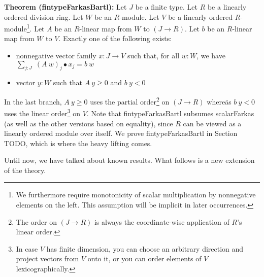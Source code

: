 \documentclass[]{article}
\renewcommand{\.}{\hskip .75pt}
\let\r=\rightarrow
\begin{document}
\medskip \noindent
\textbf{Theorem (fintypeFarkasBartl):}
Let $J$ be a finite type.
Let $R$ be a linearly ordered division ring.
Let $W$ be an $R$-module.
Let $V$ be a linearly ordered $R$-module\footnote{We furthermore require 
monotonicity of scalar multiplication by nonnegative elements on the left.
This assumption will be implicit in later occurrences.}.
Let $A$ be an $R$-linear map from $W$ to $(J \r R)$.
Let $b$ be an $R$-linear map from $W$ to $V$.
Exactly one of the following exists:
\begin{itemize}
\item nonnegative vector family $x : J \r V$ such that, for all $w : W$, we have
$ \sum_{j : J}\; (A~w)_j \bullet x_j = b~w $
\item vector $y : W$ such that $A~y \ge 0$ and $b~y < 0$
\end{itemize}
In the last branch, $A~y \ge 0$ uses the partial order\footnote{The order on $(J \r R)$ is
always the coordinate-wise application of $R$'s linear order.} on $(J \r R)$ whereäs
$b~y < 0$ uses the linear order\footnote{In case $V$ has finite dimension, you can choose
an arbitrary direction and project vectors from $V$ onto it, or you can order elements of
$V$ lexicographically.} on $V$.
Note that fintypeFarkasBartl subsumes scalarFarkas (as well as the other versions based on equality),
since $R$ can be viewed as a linearly ordered module over itself.
We prove fintypeFarkasBartl in Section TODO, which is where the heavy lifting comes.

Until now, we have talked about known results.
What follows is a new extension of the theory.
\end{document}
